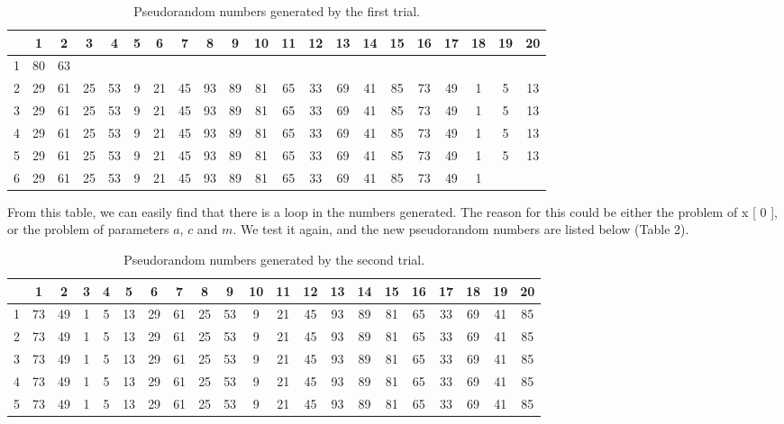 \documentclass[a4paper]{article}
\begin{document}
\begin{center}
\begin{table}[H]
\centering
\begin{tabular}{|c|cccccccccccccccccccc|}
\hline
  & 1  & 2  & 3  & 4  & 5 & 6  & 7  & 8  & 9  & 10 & 11 & 12 & 13 & 14 & 15 & 16 & 17 & 18 & 19 & 20 \\ \hline
1 & 80 & 63 &    &    &   &    &    &    &    &    &    &    &    &    &    &    &    &    &    &    \\
2 & 29 & 61 & 25 & 53 & 9 & 21 & 45 & 93 & 89 & 81 & 65 & 33 & 69 & 41 & 85 & 73 & 49 & 1  & 5  & 13 \\
3 & 29 & 61 & 25 & 53 & 9 & 21 & 45 & 93 & 89 & 81 & 65 & 33 & 69 & 41 & 85 & 73 & 49 & 1  & 5  & 13 \\
4 & 29 & 61 & 25 & 53 & 9 & 21 & 45 & 93 & 89 & 81 & 65 & 33 & 69 & 41 & 85 & 73 & 49 & 1  & 5  & 13 \\
5 & 29 & 61 & 25 & 53 & 9 & 21 & 45 & 93 & 89 & 81 & 65 & 33 & 69 & 41 & 85 & 73 & 49 & 1  & 5  & 13 \\
6 & 29 & 61 & 25 & 53 & 9 & 21 & 45 & 93 & 89 & 81 & 65 & 33 & 69 & 41 & 85 & 73 & 49 & 1  &    &    \\ \hline
\end{tabular}
\caption{Pseudorandom numbers generated by the first trial.}
\end{table}
\end{center}

	From this table, we can easily find that there is a loop in the numbers generated. The reason for this could be either the problem of x [ 0 ], or the problem of parameters $a$, $c$ and $m$. We test it again, and the new pseudorandom numbers are listed below (Table 2).

\begin{center}
\begin{table}[H]
\centering
\begin{tabular}{|c|cccccccccccccccccccc|}
\hline
  & 1  & 2  & 3 & 4 & 5  & 6  & 7  & 8  & 9  & 10 & 11 & 12 & 13 & 14 & 15 & 16 & 17 & 18 & 19 & 20 \\ \hline
1 & 73 & 49 & 1 & 5 & 13 & 29 & 61 & 25 & 53 & 9  & 21 & 45 & 93 & 89 & 81 & 65 & 33 & 69 & 41 & 85 \\
2 & 73 & 49 & 1 & 5 & 13 & 29 & 61 & 25 & 53 & 9  & 21 & 45 & 93 & 89 & 81 & 65 & 33 & 69 & 41 & 85 \\
3 & 73 & 49 & 1 & 5 & 13 & 29 & 61 & 25 & 53 & 9  & 21 & 45 & 93 & 89 & 81 & 65 & 33 & 69 & 41 & 85 \\
4 & 73 & 49 & 1 & 5 & 13 & 29 & 61 & 25 & 53 & 9  & 21 & 45 & 93 & 89 & 81 & 65 & 33 & 69 & 41 & 85 \\
5 & 73 & 49 & 1 & 5 & 13 & 29 & 61 & 25 & 53 & 9  & 21 & 45 & 93 & 89 & 81 & 65 & 33 & 69 & 41 & 85 \\ \hline
\end{tabular}
\caption{Pseudorandom numbers generated by the second trial.}
\end{table}
\end{center}
\end{document}
